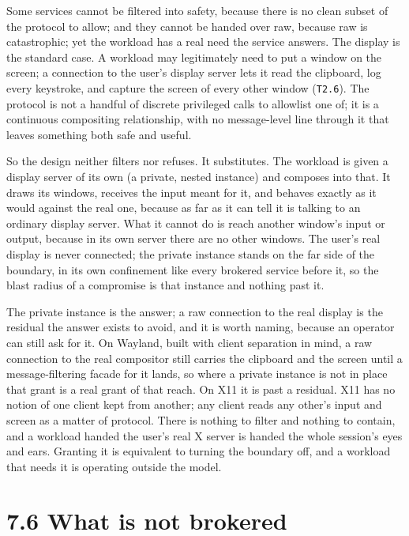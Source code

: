 Some services cannot be filtered into safety, because there is no clean
subset of the protocol to allow; and they cannot be handed over raw,
because raw is catastrophic; yet the workload has a real need the
service answers. The display is the standard case. A workload may
legitimately need to put a window on the screen; a connection to the
user's display server lets it read the clipboard, log every keystroke,
and capture the screen of every other window (\texttt{T2.6}). The
protocol is not a handful of discrete privileged calls to allowlist one
of; it is a continuous compositing relationship, with no message-level
line through it that leaves something both safe and useful.

So the design neither filters nor refuses. It substitutes. The workload
is given a display server of its own (a private, nested instance) and
composes into that. It draws its windows, receives the input meant for
it, and behaves exactly as it would against the real one, because as far
as it can tell it is talking to an ordinary display server. What it
cannot do is reach another window's input or output, because in its own
server there are no other windows. The user's real display is never
connected; the private instance stands on the far side of the boundary,
in its own confinement like every brokered service before it, so the
blast radius of a compromise is that instance and nothing past it.

The private instance is the answer; a raw connection to the real display
is the residual the answer exists to avoid, and it is worth naming,
because an operator can still ask for it. On Wayland, built with client
separation in mind, a raw connection to the real compositor still
carries the clipboard and the screen until a message-filtering facade
for it lands, so where a private instance is not in place that grant is
a real grant of that reach. On X11 it is past a residual. X11 has no
notion of one client kept from another; any client reads any other's
input and screen as a matter of protocol. There is nothing to filter and
nothing to contain, and a workload handed the user's real X server is
handed the whole session's eyes and ears. Granting it is equivalent to
turning the boundary off, and a workload that needs it is operating
outside the model.

\hypertarget{what-is-not-brokered}{%
\section{7.6 What is not brokered}\label{what-is-not-brokered}}

